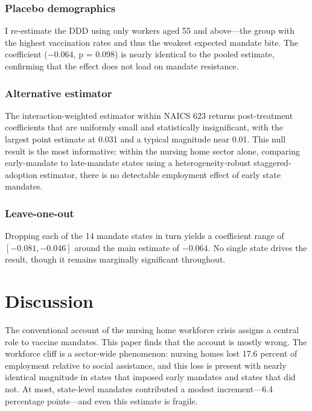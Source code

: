 \documentclass[12pt]{article}
\begin{document}
\subsubsection*{Placebo demographics} I re-estimate the DDD using only workers aged 55 and above---the group with the highest vaccination rates and thus the weakest expected mandate bite. The coefficient ($-0.064$, p = 0.098) is nearly identical to the pooled estimate, confirming that the effect does not load on mandate resistance.

\subsubsection*{Alternative estimator} The \citet{sun2021estimating} interaction-weighted estimator within NAICS 623 returns post-treatment coefficients that are uniformly small and statistically insignificant, with the largest point estimate at 0.031 and a typical magnitude near 0.01. This null result is the most informative: within the nursing home sector alone, comparing early-mandate to late-mandate states using a heterogeneity-robust staggered-adoption estimator, there is no detectable employment effect of early state mandates.

\subsubsection*{Leave-one-out} Dropping each of the 14 mandate states in turn yields a coefficient range of $[-0.081, -0.046]$ around the main estimate of $-0.064$. No single state drives the result, though it remains marginally significant throughout.




\section{Discussion}

The conventional account of the nursing home workforce crisis assigns a central role to vaccine mandates. This paper finds that the account is mostly wrong. The workforce cliff is a sector-wide phenomenon: nursing homes lost 17.6 percent of employment relative to social assistance, and this loss is present with nearly identical magnitude in states that imposed early mandates and states that did not. At most, state-level mandates contributed a modest increment---6.4 percentage points---and even this estimate is fragile.
\end{document}
